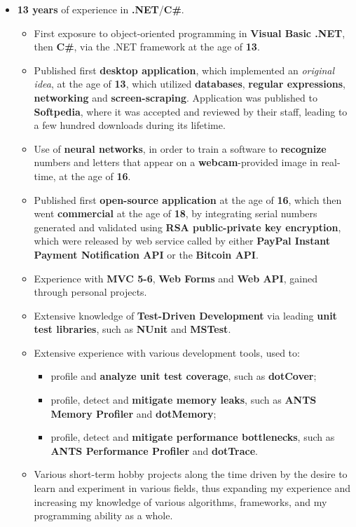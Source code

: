 \documentclass[11pt,a4paper,sans]{moderncv}
\begin{document}
	\begin{itemize}
	\item	\label{softdevcs}  \textbf{13 years} of experience in \textbf{.NET}/\textbf{C\#}.
		\begin{itemize}
		\item	First exposure to object-oriented programming in \textbf{Visual Basic .NET}, then \textbf{C\#}, via the .NET framework at the age of \textbf{13}.
		\item	Published first \textbf{desktop application}, which implemented an \textit{original idea}, at the age of \textbf{13}, which utilized \textbf{databases}, \textbf{regular expressions}, \textbf{networking} and \textbf{screen-scraping}. Application was published to \textbf{Softpedia}, where it was accepted and reviewed by their staff, leading to a few hundred downloads during its lifetime. 
		\item	Use of \textbf{neural networks}, in order to train a software to \textbf{recognize} numbers and letters that appear on a \textbf{webcam}-provided image in real-time, at the age of \textbf{16}.
		\item	Published first \textbf{open-source application} at the age of \textbf{16}, which then went \textbf{commercial} at the age of \textbf{18}, by integrating serial numbers generated and validated using \textbf{RSA public-private key encryption}, which were released by web service called by either \textbf{PayPal Instant Payment Notification API} or the \textbf{Bitcoin API}.
		\item	Experience with \textbf{MVC 5-6}, \textbf{Web Forms} and \textbf{Web API}, gained through personal projects.
		\item	Extensive knowledge of \textbf{Test-Driven Development} via leading \textbf{unit test libraries}, such as \textbf{NUnit} and \textbf{MSTest}.
		\item	Extensive experience with various development tools, used to:
			\begin{itemize}
			\item	profile and \textbf{analyze unit test coverage}, such as \textbf{dotCover};
			\item	profile, detect and \textbf{mitigate memory leaks}, such as \textbf{ANTS Memory Profiler} and \textbf{dotMemory};
			\item	profile, detect and \textbf{mitigate performance bottlenecks}, such as \textbf{ANTS Performance Profiler} and \textbf{dotTrace}.
			\end{itemize}
		\item	Various short-term hobby projects along the time driven by the desire to learn and experiment in various fields, thus expanding my experience and increasing my knowledge of various algorithms, frameworks, and my programming ability as a whole.
		\end{itemize}
	\end{itemize}
\end{document}
